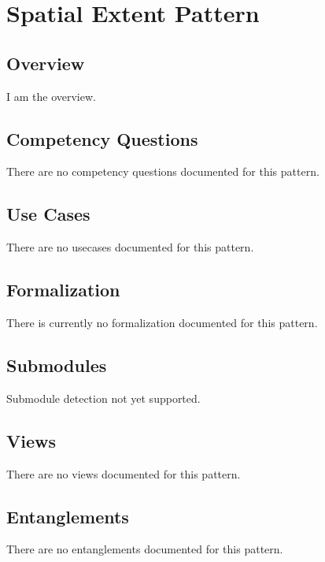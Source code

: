 
\section{Spatial Extent Pattern}
\label{sec:spatial-extent-pattern}
\subsection{Overview}
\label{ssec:overview}
I am the overview.

\subsection{Competency Questions}
\label{ssec:cqs}
There are no competency questions documented for this pattern.

\subsection{Use Cases}
\label{ssec:use-cases}
There are no usecases documented for this pattern.
\subsection{Formalization}
\label{ssec:formalization}
There is currently no formalization documented for this pattern.

\subsection{Submodules}
\label{ssec:submodules}
Submodule detection not yet supported.

\subsection{Views}
\label{ssec:views}
There are no views documented for this pattern.


\subsection{Entanglements}
\label{ssec:entanglements}
There are no entanglements documented for this pattern.

